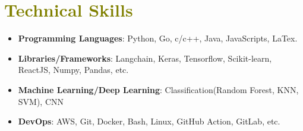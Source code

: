 \documentclass[a4paper,11pt]{article}
\begin{document}
\section{\textcolor{olive}{\textbf{Technical Skills}}}

    \vspace{1.0mm}

    \begin{itemize}[leftmargin=0.15in, label={-}, itemsep=-2pt, topsep=0pt]
        \item \textbf{Programming Languages}: Python, Go, c/c++, Java, JavaScripts, LaTex.
        \item \textbf{Libraries/Frameworks}: Langchain, Keras, Tensorflow, Scikit-learn, ReactJS, Numpy, Pandas, etc.
        \item \textbf{Machine Learning/Deep Learning}: Classification(Random Forest, KNN, SVM), CNN
        \item \textbf{DevOps}: AWS, Git, Docker, Bash, Linux, GitHub Action, GitLab, etc.
    \end{itemize}

\end{document}
